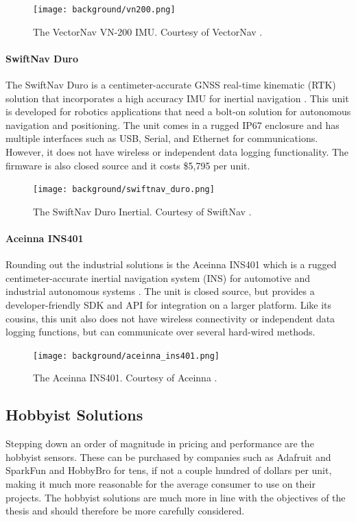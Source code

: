 \begin{figure}
    \centering
    \caption[VectorNav VN-200]{The VectorNav VN-200 IMU.
    Courtesy of VectorNav \cite{VectorNav:VN200}.}
    \texttt{[image: background/vn200.png]}
\end{figure}

\paragraph*{SwiftNav Duro} The SwiftNav Duro is a centimeter-accurate GNSS real-time kinematic (RTK) solution that incorporates a high accuracy IMU for inertial navigation \cite{SwiftNav}.
This unit is developed for robotics applications that need a bolt-on solution for autonomous navigation and positioning.
The unit comes in a rugged IP67 enclosure and has multiple interfaces such as USB, Serial, and Ethernet for communications.
However, it does not have wireless or independent data logging functionality.
The firmware is also closed source and it costs \$5,795 per unit.

\begin{figure}
    \centering
    \caption[SwiftNav Duro]{The SwiftNav Duro Inertial.
    Courtesy of SwiftNav \cite{SwiftNav}.}
    \texttt{[image: background/swiftnav\_duro.png]}
\end{figure}

\paragraph*{Aceinna INS401} Rounding out the industrial solutions is the Aceinna INS401 which is a rugged centimeter-accurate inertial navigation system (INS) for automotive and industrial autonomous systems \cite{Aceinna}.
The unit is closed source, but provides a developer-friendly SDK and API for integration on a larger platform.
Like its cousins, this unit also does not have wireless connectivity or independent data logging functions, but can communicate over several hard-wired methods.

\begin{figure}
    \centering
    \caption[Aceinna INS401]{The Aceinna INS401.
    Courtesy of Aceinna \cite{Aceinna}.}
    \texttt{[image: background/aceinna\_ins401.png]}
\end{figure}

\subsection{Hobbyist Solutions}
Stepping down an order of magnitude in pricing and performance are the hobbyist sensors.
These can be purchased by companies such as Adafruit and SparkFun and HobbyBro for tens, if not a couple hundred of dollars per unit, making it much more reasonable for the average consumer to use on their projects.
The hobbyist solutions are much more in line with the objectives of the thesis and should therefore be more carefully considered.

